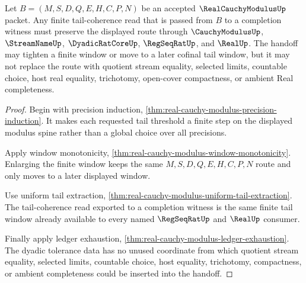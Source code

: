 \begin{theorem}
\label{thm:real-cauchy-modulus-tail-coherence-completeness-handoff}
Let $B=(M,S,D,Q,E,H,C,P,N)$ be an accepted $\RealCauchyModulusUp$ packet. Any finite tail-coherence read that is passed from $B$ to a completion witness must preserve the displayed route through $\CauchyModulusUp$, $\StreamNameUp$, $\DyadicRatCoreUp$, $\RegSeqRatUp$, and $\RealUp$. The handoff may tighten a finite window or move to a later cofinal tail window, but it may not replace the route with quotient stream equality, selected limits, countable choice, host real equality, trichotomy, open-cover compactness, or ambient Real completeness.
\end{theorem}
\begin{proof}
Begin with precision induction, \autoref{thm:real-cauchy-modulus-precision-induction}. It makes each requested tail threshold a finite step on the displayed modulus spine rather than a global choice over all precisions.

Apply window monotonicity, \autoref{thm:real-cauchy-modulus-window-monotonicity}. Enlarging the finite window keeps the same $M,S,D,Q,E,H,C,P,N$ route and only moves to a later displayed window.

Use uniform tail extraction, \autoref{thm:real-cauchy-modulus-uniform-tail-extraction}. The tail-coherence read exported to a completion witness is the same finite tail window already available to every named $\RegSeqRatUp$ and $\RealUp$ consumer.

Finally apply ledger exhaustion, \autoref{thm:real-cauchy-modulus-ledger-exhaustion}. The dyadic tolerance data has no unused coordinate from which quotient stream equality, selected limits, countable choice, host equality, trichotomy, compactness, or ambient completeness could be inserted into the handoff.
\end{proof}



